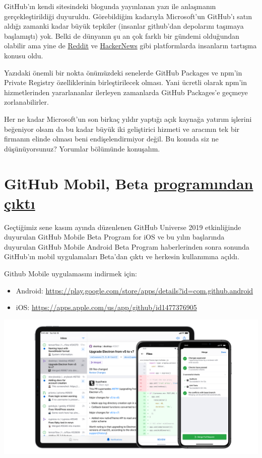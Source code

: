 \documentclass[11pt]{article}
\begin{document}
GitHub'ın kendi sitesindeki blogunda yayınlanan yazı ile anlaşmanın
gerçekleştirildiği duyuruldu. Görebildiğim kadarıyla Microsoft'un GitHub'ı
satın aldığı zamanki kadar büyük tepkiler (insanlar github'dan depolarını
taşımaya başlamıştı) yok. Belki de dünyanın şu an çok farklı bir gündemi
olduğundan olabilir ama yine de \href{https://www.reddit.com/r/node/comments/fjocuy/npm\_is\_joining\_github\_and\_is\_now\_owned\_by/}{Reddit} ve \href{https://news.ycombinator.com/item?id=22594549}{HackerNews} gibi platformlarda
insanların tartışma konusu oldu.

Yazıdaki önemli bir nokta önümüzdeki senelerde GitHub Packages ve npm'in
Private Registry özelliklerinin birleştirilecek olması. Yani ücretli olarak
npm'in hizmetlerinden yararlananlar ilerleyen zamanlarda GitHub Packages'e
geçmeye zorlanabilirler.

Her ne kadar Microsoft'un son birkaç yıldır yaptığı açık kaynağa yatırım
işlerini beğeniyor olsam da bu kadar büyük iki geliştirici hizmeti ve aracının
tek bir firmanın elinde olması beni endişelendirmiyor değil. Bu konuda siz ne
düşünüyorsunuz? Yorumlar bölümünde konuşalım.
\section{GitHub Mobil, Beta \href{https://github.blog/2020-03-17-github-for-mobile-is-now-available/}{programından çıktı}}
\label{sec:org54dab42}
Geçtiğimiz sene kasım ayında düzenlenen GitHub Universe 2019 etkinliğinde
duyurulan GitHub Mobile Beta Program for iOS ve bu yılın başlarında duyurulan
GitHub Mobile Android Beta Program haberlerinden sonra sonunda GitHub'ın mobil
uygulamaları Beta'dan çıktı ve herkesin kullanımına açıldı.

Github Mobile uygulamasını indirmek için:
\begin{itemize}
\item Android: \url{https://play.google.com/store/apps/details?id=com.github.android}
\item iOS: \url{https://apps.apple.com/us/app/github/id1477376905}
\end{itemize}

\begin{center}
\includegraphics[width=.9\linewidth]{gorseller/github-mobile.png}
\end{center}
\end{document}
